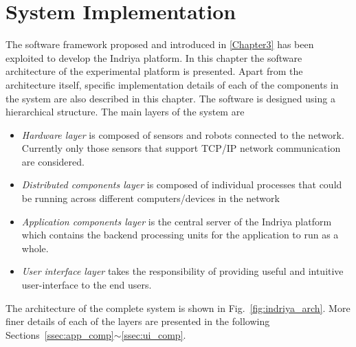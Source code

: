 
\chapter{System Implementation} %

\label{Chapter4} %

The software framework proposed and introduced in \ref{Chapter3} has been exploited to develop the Indriya platform. In this chapter the software architecture of the experimental platform is presented. Apart from the architecture itself, specific implementation details of each of the components in the system are also described in this chapter. The software is designed using a hierarchical structure. The main layers of the system are
\begin{itemize}
\item \emph{Hardware layer} is composed of sensors and robots connected to the network. Currently only those sensors that support TCP/IP network communication are considered.
\item \emph{Distributed components layer} is composed of individual processes that could be running across different computers/devices in the network
\item \emph{Application components layer} is the central server of the Indriya platform which contains the backend processing units for the application to run as a whole.
\item \emph{User interface layer} takes the responsibility of providing useful and intuitive user-interface to the end users.
\end{itemize}
The architecture of the complete system is shown in Fig.~\ref{fig:indriya_arch}. More finer details of each of the layers are presented in the following Sections~\ref{ssec:app_comp}$\sim$\ref{ssec:ui_comp}.
